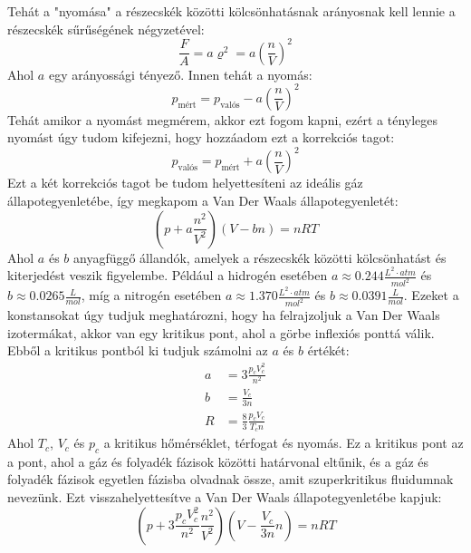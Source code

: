 \documentclass[../main.tex]{subfiles}
\begin{document}
Tehát a "nyomása" a részecskék közötti kölcsönhatásnak arányosnak kell lennie a részecskék sűrűségének négyzetével:
\begin{equation}
    \frac{F}{A} = a \varrho^2 = a \left(\frac{n}{V}\right)^2
\end{equation}
Ahol $a$ egy arányossági tényező. Innen tehát a nyomás:
\begin{equation}
    p_{\text{mért}} = p_{\text{valós}} - a \left(\frac{n}{V}\right)^2
\end{equation}
Tehát amikor a nyomást megmérem, akkor ezt fogom kapni, ezért a tényleges nyomást úgy tudom kifejezni, hogy hozzáadom ezt a korrekciós tagot:
\begin{equation}
    p_{\text{valós}} = p_{\text{mért}} + a \left(\frac{n}{V}\right)^2
\end{equation}
Ezt a két korrekciós tagot be tudom helyettesíteni az ideális gáz állapotegyenletébe, így megkapom a Van Der Waals állapotegyenletét:
\begin{equation}
    \left(p + a \frac{n^2}{V^2}\right) (V - b n) = n R T
\end{equation}
Ahol $a$ és $b$ anyagfüggő állandók, amelyek a részecskék közötti kölcsönhatást és kiterjedést veszik figyelembe. Például a hidrogén esetében $a \approx 0.244 \frac{L^2 \cdot atm}{mol^2}$ és $b \approx 0.0265 \frac{L}{mol}$, míg a
nitrogén esetében $a \approx 1.370 \frac{L^2 \cdot atm}{mol^2}$ és $b \approx 0.0391 \frac{L}{mol}$. Ezeket a konstansokat úgy tudjuk meghatározni,
hogy ha felrajzoljuk a Van Der Waals izotermákat, akkor van egy kritikus pont, ahol a görbe inflexiós ponttá válik. Ebből a kritikus pontból ki tudjuk számolni az $a$ és $b$ értékét:
\begin{equation}
    \begin{aligned}
        a &= 3\frac{p_c V_c^2}{n^2} \\
        b &= \frac{V_c}{3n} \\
        R &= \frac{8}{3} \frac{p_c V_c}{T_c n}
    \end{aligned}
\end{equation}
Ahol $T_c$, $V_c$ és $p_c$ a kritikus hőmérséklet, térfogat és nyomás. Ez a kritikus pont az a pont, ahol a gáz és folyadék fázisok közötti határvonal eltűnik, és a gáz és folyadék fázisok egyetlen fázisba olvadnak össze, amit szuperkritikus fluidumnak nevezünk.
Ezt visszahelyettesítve a Van Der Waals állapotegyenletébe kapjuk:
\begin{equation}
    \left(p + 3\frac{p_c V_c^2}{n^2} \frac{n^2}{V^2}\right) \left(V - \frac{V_c}{3n} n\right) = n R T
\end{equation}
\end{document}
